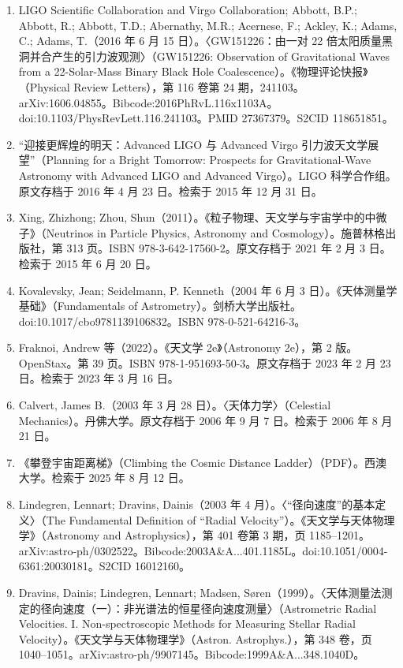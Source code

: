 \begin{enumerate}
  \item LIGO Scientific Collaboration and Virgo Collaboration; Abbott, B.P.; Abbott, R.; Abbott, T.D.; Abernathy, M.R.; Acernese, F.; Ackley, K.; Adams, C.; Adams, T.（2016 年 6 月 15 日）。〈GW151226：由一对 22 倍太阳质量黑洞并合产生的引力波观测〉（GW151226: Observation of Gravitational Waves from a 22-Solar-Mass Binary Black Hole Coalescence）。《物理评论快报》（Physical Review Letters），第 116 卷第 24 期，241103。arXiv:1606.04855。Bibcode:2016PhRvL.116x1103A。doi:10.1103/PhysRevLett.116.241103。PMID 27367379。S2CID 118651851。
  \item “迎接更辉煌的明天：Advanced LIGO 与 Advanced Virgo 引力波天文学展望”（Planning for a Bright Tomorrow: Prospects for Gravitational-Wave Astronomy with Advanced LIGO and Advanced Virgo）。LIGO 科学合作组。原文存档于 2016 年 4 月 23 日。检索于 2015 年 12 月 31 日。
  \item Xing, Zhizhong; Zhou, Shun（2011）。《粒子物理、天文学与宇宙学中的中微子》（Neutrinos in Particle Physics, Astronomy and Cosmology）。施普林格出版社，第 313 页。ISBN 978-3-642-17560-2。原文存档于 2021 年 2 月 3 日。检索于 2015 年 6 月 20 日。
  \item Kovalevsky, Jean; Seidelmann, P. Kenneth（2004 年 6 月 3 日）。《天体测量学基础》（Fundamentals of Astrometry）。剑桥大学出版社。doi:10.1017/cbo9781139106832。ISBN 978-0-521-64216-3。
  \item Fraknoi, Andrew 等（2022）。《天文学 2e》（Astronomy 2e），第 2 版。OpenStax。第 39 页。ISBN 978-1-951693-50-3。原文存档于 2023 年 2 月 23 日。检索于 2023 年 3 月 16 日。
  \item Calvert, James B.（2003 年 3 月 28 日）。〈天体力学〉（Celestial Mechanics）。丹佛大学。原文存档于 2006 年 9 月 7 日。检索于 2006 年 8 月 21 日。
  \item 《攀登宇宙距离梯》（Climbing the Cosmic Distance Ladder）（PDF）。西澳大学。检索于 2025 年 8 月 12 日。
  \item Lindegren, Lennart; Dravins, Dainis（2003 年 4 月）。〈“径向速度”的基本定义〉（The Fundamental Definition of “Radial Velocity”）。《天文学与天体物理学》（Astronomy and Astrophysics），第 401 卷第 3 期，页 1185–1201。arXiv:astro-ph/0302522。Bibcode:2003A\&A...401.1185L。doi:10.1051/0004-6361:20030181。S2CID 16012160。
  \item Dravins, Dainis; Lindegren, Lennart; Madsen, Søren（1999）。〈天体测量法测定的径向速度（一）：非光谱法的恒星径向速度测量〉（Astrometric Radial Velocities. I. Non-spectroscopic Methods for Measuring Stellar Radial Velocity）。《天文学与天体物理学》（Astron. Astrophys.），第 348 卷，页 1040–1051。arXiv:astro-ph/9907145。Bibcode:1999A\&A...348.1040D。

\end{enumerate}
